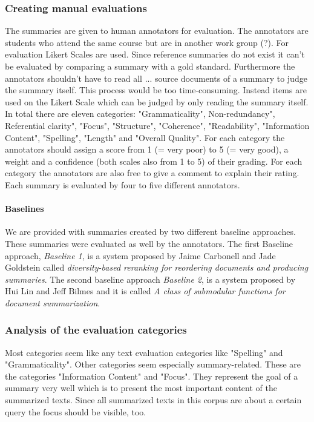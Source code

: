 
\subsubsection{Creating manual evaluations}
The summaries are given to human annotators for evaluation. The annotators are students who attend the same course but are in another work group (?). For evaluation Likert Scales are used. Since reference summaries do not exist it can't be evaluated by comparing a summary with a gold standard. Furthermore the annotators shouldn't have to read all ... source documents of a summary to judge the summary itself. This process would be too time-consuming. Instead items are used on the Likert Scale which can be judged by only reading the summary itself. In total there are eleven categories: "Grammaticality", Non-redundancy", Referential clarity", "Focus", "Structure", "Coherence", "Readability", "Information Content", "Spelling", "Length" and "Overall Quality". For each category the annotators should assign a score from 1 (= very poor) to 5 (= very good), a weight and a confidence (both scales also from 1 to 5) of their grading. For each category the annotators are also free to give a comment to explain their rating. Each summary is evaluated by four to five different annotators.

\paragraph{Baselines}
We are provided with summaries created by two different baseline approaches. These summaries were evaluated as well by the annotators. The first Baseline approach, \textit{Baseline 1}, is a system proposed by Jaime Carbonell and Jade Goldstein called \textit{diversity-based reranking for reordering documents and producing summaries}. The second baseline approach \textit{Baseline 2}, is a system proposed by Hui Lin and Jeff Bilmes and it is called \textit{A class of submodular functions for document summarization}.

\subsubsection{Analysis of the evaluation categories}
Most categories seem like any text evaluation categories like "Spelling" and "Grammaticality". Other categories seem especially summary-related. These are the categories "Information Content" and "Focus". They represent the goal of a summary very well which is to present the most important content of the summarized texts. Since all summarized texts in this corpus are about a certain query the focus should be visible, too.

